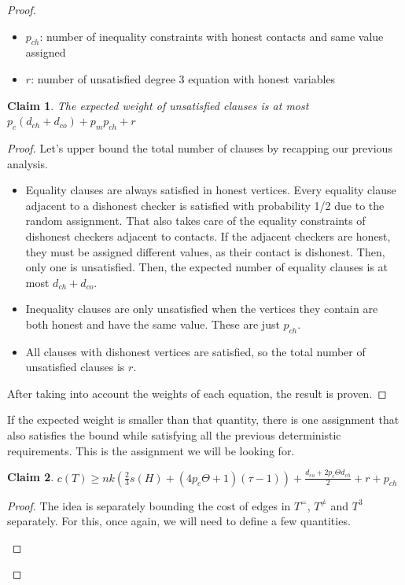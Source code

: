\documentclass[12pt]{article}
\newtheorem{claim}{Claim}
\begin{document}
\begin{proof}
\begin{itemize}
        \item $p_{ch}$: number of inequality constraints with honest contacts and same value assigned
        \item $r$: number of unsatisfied degree 3 equation with honest variables
    \end{itemize}
    \begin{claim}
        The expected weight of unsatisfied clauses is at most $p_c(d_{ch}+d_{co})+p_m p_{ch}+r$
    \end{claim}
    \begin{proof}
        Let's upper bound the total number of clauses by recapping our previous analysis. 
        \begin{itemize}
            \item Equality clauses are always satisfied in honest vertices. 
            Every equality clause adjacent to a dishonest checker is satisfied with probability 1/2 due to the random assignment. 
            That also takes care of the equality constraints of dishonest checkers adjacent to contacts. 
            If the adjacent checkers are honest, they must be assigned different values, as their contact is dishonest. Then, only one is unsatisfied.
            Then, the expected number of equality clauses is at most $d_{ch}+d_{co}$.
            \item Inequality clauses are only unsatisfied when the vertices they contain are both honest and have the same value. These are just $p_{ch}$.
            \item All clauses with dishonest vertices are satisfied, so the total number of unsatisfied clauses is $r$.
        \end{itemize}
        After taking into account the weights of each equation, the result is proven. 
    \end{proof}
    If the expected weight is smaller than that quantity, there is one assignment that also satisfies the bound while satisfying all the previous deterministic requirements. This is the assignment we will be looking for. 
    \begin{claim}
        $c(T)\geq  nk(\frac{2}{3}s(H)+(4p_c\Theta +1) (\tau-1))+ \frac{d_{co}+2p_c\Theta d_{ch}}{2}+r+p_{ch}$
    \end{claim}
    \begin{proof}
    The idea is separately bounding the cost of edges in $T^=$, $T^{\not=}$ and $T^3$ separately. 
    For this, once again, we will need to define a few quantities. 
    \begin{itemize}

\end{itemize}
\end{proof}
\end{proof}
\end{document}
